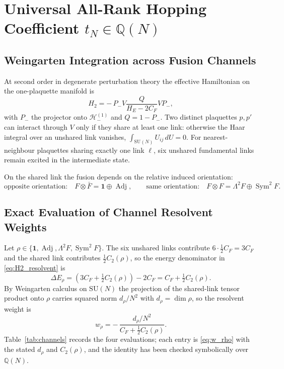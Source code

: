 \documentclass[11pt,a4paper]{article}
\theoremstyle{definition}
\DeclareMathOperator{\Adj}{Adj}
\DeclareMathOperator{\Sym}{Sym}
\newcommand{\Q}{\mathbb{Q}}
\newcommand{\CF}{C_F}
\newcommand{\SU}{\mathrm{SU}}
\begin{document}
\section{Universal All-Rank Hopping Coefficient \texorpdfstring{$t_N \in \Q(N)$}{t\_N in Q(N)}}\label{sec:weingarten}

\subsection{Weingarten Integration across Fusion Channels}

At second order in degenerate perturbation theory the effective Hamiltonian on the one-plaquette manifold is
\begin{equation}\label{eq:H2_resolvent}
  H_2 = -\,P_- V \frac{Q}{H_E - 2\CF} V P_-,
\end{equation}
with $P_-$ the projector onto $\mathcal{H}^{(1)}_-$ and $Q = 1 - P_-$. Two distinct plaquettes $p, p'$ can interact through $V$ only if they share at least one link: otherwise the Haar integral over an unshared link vanishes, $\int_{\SU(N)}U_{ij}\,dU = 0$. For nearest-neighbour plaquettes sharing exactly one link $\ell$, six unshared fundamental links remain excited in the intermediate state.

On the shared link the fusion depends on the relative induced orientation:
\begin{equation}
  \text{opposite orientation:}\quad F\otimes\bar F = \mathbf{1}\oplus\Adj,
  \qquad
  \text{same orientation:}\quad F\otimes F = \Lambda^2 F\oplus\Sym^2 F .
\end{equation}

\subsection{Exact Evaluation of Channel Resolvent Weights}

Let $\rho\in\{\mathbf{1},\Adj,\Lambda^2F,\Sym^2F\}$. The six unshared links contribute $6\cdot\tfrac12\CF = 3\CF$ and the shared link contributes $\tfrac12 C_2(\rho)$, so the energy denominator in \eqref{eq:H2_resolvent} is
\begin{equation}\label{eq:Delta_E_rho}
  \Delta E_\rho = \left(3\CF + \tfrac{1}{2}C_2(\rho)\right) - 2\CF = \CF + \tfrac{1}{2}C_2(\rho).
\end{equation}
By Weingarten calculus on $\SU(N)$ \cite{Weingarten1978,CollinsSniady2006} the projection of the shared-link tensor product onto $\rho$ carries squared norm $d_\rho/N^2$ with $d_\rho = \dim\rho$, so the resolvent weight is
\begin{equation}\label{eq:w_rho}
  w_\rho = -\,\frac{d_\rho/N^2}{\CF + \tfrac12 C_2(\rho)} .
\end{equation}
Table~\ref{tab:channels} records the four evaluations; each entry is \eqref{eq:w_rho} with the stated $d_\rho$ and $C_2(\rho)$, and the identity has been checked symbolically over $\Q(N)$.
\end{document}
